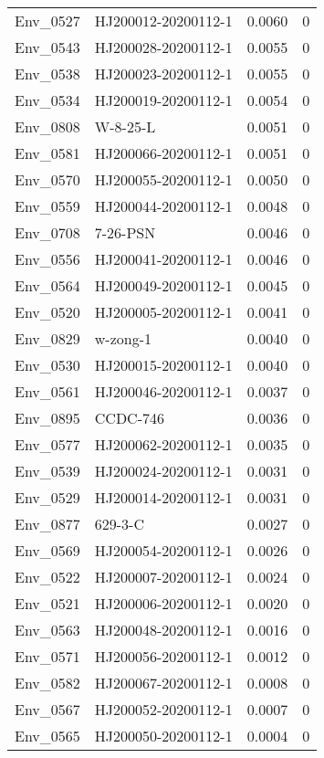 \begin{longtable}{llrr}
  Env\_0527 & HJ200012-20200112-1 & 0.0060 &     0 \\ 
  Env\_0543 & HJ200028-20200112-1 & 0.0055 &     0 \\ 
  Env\_0538 & HJ200023-20200112-1 & 0.0055 &     0 \\ 
  Env\_0534 & HJ200019-20200112-1 & 0.0054 &     0 \\ 
  Env\_0808 & W-8-25-L & 0.0051 &     0 \\ 
  Env\_0581 & HJ200066-20200112-1 & 0.0051 &     0 \\ 
  Env\_0570 & HJ200055-20200112-1 & 0.0050 &     0 \\ 
  Env\_0559 & HJ200044-20200112-1 & 0.0048 &     0 \\ 
  Env\_0708 & 7-26-PSN & 0.0046 &     0 \\ 
  Env\_0556 & HJ200041-20200112-1 & 0.0046 &     0 \\ 
  Env\_0564 & HJ200049-20200112-1 & 0.0045 &     0 \\ 
  Env\_0520 & HJ200005-20200112-1 & 0.0041 &     0 \\ 
  Env\_0829 & w-zong-1 & 0.0040 &     0 \\ 
  Env\_0530 & HJ200015-20200112-1 & 0.0040 &     0 \\ 
  Env\_0561 & HJ200046-20200112-1 & 0.0037 &     0 \\ 
  Env\_0895 & CCDC-746 & 0.0036 &     0 \\ 
  Env\_0577 & HJ200062-20200112-1 & 0.0035 &     0 \\ 
  Env\_0539 & HJ200024-20200112-1 & 0.0031 &     0 \\ 
  Env\_0529 & HJ200014-20200112-1 & 0.0031 &     0 \\ 
  Env\_0877 & 629-3-C & 0.0027 &     0 \\ 
  Env\_0569 & HJ200054-20200112-1 & 0.0026 &     0 \\ 
  Env\_0522 & HJ200007-20200112-1 & 0.0024 &     0 \\ 
  Env\_0521 & HJ200006-20200112-1 & 0.0020 &     0 \\ 
  Env\_0563 & HJ200048-20200112-1 & 0.0016 &     0 \\ 
  Env\_0571 & HJ200056-20200112-1 & 0.0012 &     0 \\ 
  Env\_0582 & HJ200067-20200112-1 & 0.0008 &     0 \\ 
  Env\_0567 & HJ200052-20200112-1 & 0.0007 &     0 \\ 
  Env\_0565 & HJ200050-20200112-1 & 0.0004 &     0 \\ 

\end{longtable}
